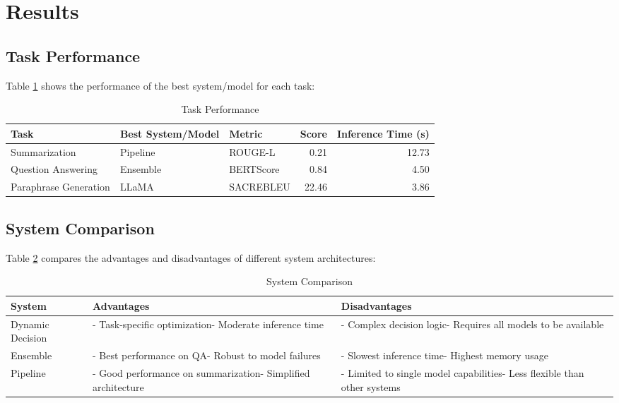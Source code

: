\documentclass[10pt,twocolumn,letterpaper]{article}
\begin{document}
\section{Results}

\subsection{Task Performance}

Table \ref{tab:task_performance} shows the performance of the best system/model for each task:

\begin{table}[h]
\centering
\caption{Task Performance}
\label{tab:task_performance}
\begin{tabular}{@{}lllrr@{}}
\toprule
Task & Best System/Model & Metric & Score & Inference Time (s) \\
\midrule
Summarization & Pipeline & ROUGE-L & 0.21 & 12.73 \\
Question Answering & Ensemble & BERTScore & 0.84 & 4.50 \\
Paraphrase Generation & LLaMA & SACREBLEU & 22.46 & 3.86 \\
\bottomrule
\end{tabular}
\end{table}

\subsection{System Comparison}

Table \ref{tab:system_comparison} compares the advantages and disadvantages of different system architectures:

\begin{table}[h]
\centering
\caption{System Comparison}
\label{tab:system_comparison}
\begin{tabular}{@{}lp{3cm}p{3cm}@{}}
\toprule
System & Advantages & Disadvantages \\
\midrule
Dynamic Decision & - Task-specific optimization\newline - Moderate inference time & - Complex decision logic\newline - Requires all models to be available \\
\midrule
Ensemble & - Best performance on QA\newline - Robust to model failures & - Slowest inference time\newline - Highest memory usage \\
\midrule
Pipeline & - Good performance on summarization\newline - Simplified architecture & - Limited to single model capabilities\newline - Less flexible than other systems \\
\bottomrule
\end{tabular}
\end{table}
\end{document}
